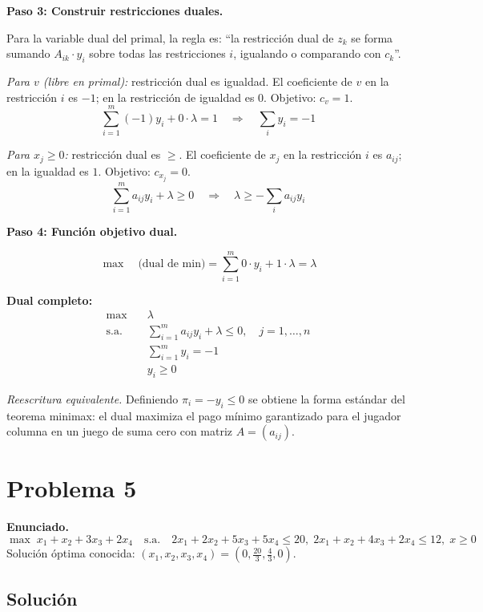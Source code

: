 \documentclass{article}
\begin{document}
\textbf{Paso 3: Construir restricciones duales.}

Para la variable dual del primal, la regla es: ``la restricción dual de $z_k$ se forma sumando $A_{ik}\cdot y_i$ sobre todas las restricciones $i$, igualando o comparando con $c_k$''.

\textit{Para $v$ (libre en primal):} restricción dual es igualdad.
El coeficiente de $v$ en la restricción $i$ es $-1$; en la restricción de igualdad es $0$. Objetivo: $c_v=1$.
$$\sum_{i=1}^m(-1)y_i + 0\cdot\lambda = 1 \quad\Rightarrow\quad \sum_i y_i = -1$$

\textit{Para $x_j\geq0$:} restricción dual es $\geq$.
El coeficiente de $x_j$ en la restricción $i$ es $a_{ij}$; en la igualdad es $1$. Objetivo: $c_{x_j}=0$.
$$\sum_{i=1}^m a_{ij}y_i + \lambda \geq 0 \quad\Rightarrow\quad \lambda \geq -\sum_i a_{ij}y_i$$

\textbf{Paso 4: Función objetivo dual.}

$$\max\quad \text{(dual de min)} = \sum_{i=1}^m 0\cdot y_i + 1\cdot\lambda = \lambda$$

\textbf{Dual completo:}
$$\begin{aligned}
\max\quad &\lambda \\
\text{s.a.}\quad
&\sum_{i=1}^m a_{ij}y_i + \lambda \leq 0,\quad j=1,\ldots,n\\
&\sum_{i=1}^m y_i = -1\\
&y_i\geq0
\end{aligned}$$

\textit{Reescritura equivalente.} Definiendo $\pi_i=-y_i\leq0$ se obtiene la forma estándar del teorema minimax: el dual maximiza el pago mínimo garantizado para el jugador columna en un juego de suma cero con matriz $A=(a_{ij})$.

\newpage
\section*{Problema 5}

\textbf{Enunciado.}
$$\max\;x_1+x_2+3x_3+2x_4\quad\text{s.a.}\quad
2x_1+2x_2+5x_3+5x_4\leq20,\;2x_1+x_2+4x_3+2x_4\leq12,\;x\geq0$$
Solución óptima conocida: $(x_1,x_2,x_3,x_4)=(0,\tfrac{20}{3},\tfrac{4}{3},0)$.

\subsection*{Solución}
\end{document}
